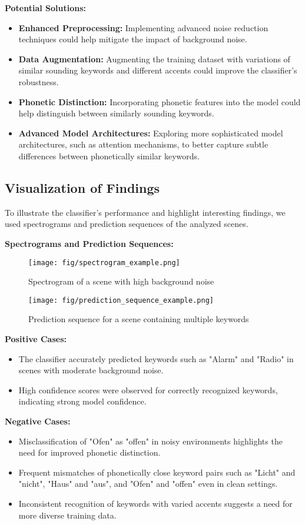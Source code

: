 \textbf{Potential Solutions:}
\begin{itemize}
    \item \textbf{Enhanced Preprocessing:} Implementing advanced noise reduction techniques could help mitigate the impact of background noise.
    \item \textbf{Data Augmentation:} Augmenting the training dataset with variations of similar sounding keywords and different accents could improve the classifier's robustness.
    \item \textbf{Phonetic Distinction:} Incorporating phonetic features into the model could help distinguish between similarly sounding keywords.
    \item \textbf{Advanced Model Architectures:} Exploring more sophisticated model architectures, such as attention mechanisms, to better capture subtle differences between phonetically similar keywords.
\end{itemize}

\subsection{Visualization of Findings}
To illustrate the classifier's performance and highlight interesting findings, we used spectrograms and prediction sequences of the analyzed scenes.

\textbf{Spectrograms and Prediction Sequences:}
\begin{figure}[!ht]
    \centering
    \texttt{[image: fig/spectrogram\_example.png]}
    \caption{Spectrogram of a scene with high background noise}
    \label{fig:spectrogram_example}
\end{figure}

\begin{figure}[!ht]
    \centering
    \texttt{[image: fig/prediction\_sequence\_example.png]}
    \caption{Prediction sequence for a scene containing multiple keywords}
    \label{fig:prediction_sequence_example}
\end{figure}

\textbf{Positive Cases:}
\begin{itemize}
    \item The classifier accurately predicted keywords such as "Alarm" and "Radio" in scenes with moderate background noise.
    \item High confidence scores were observed for correctly recognized keywords, indicating strong model confidence.
\end{itemize}

\textbf{Negative Cases:}
\begin{itemize}
    \item Misclassification of "Ofen" as "offen" in noisy environments highlights the need for improved phonetic distinction.
    \item Frequent mismatches of phonetically close keyword pairs such as "Licht" and "nicht", "Haus" and "aus", and "Ofen" and "offen" even in clean settings.
    \item Inconsistent recognition of keywords with varied accents suggests a need for more diverse training data.
\end{itemize}
